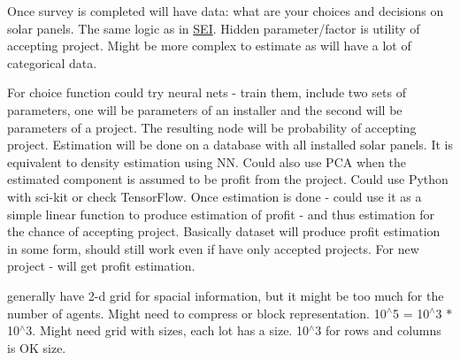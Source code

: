
\begin{DoxyRefList}
\item[\label{wp__wp000001}%
\hypertarget{wp__wp000001}{}%
Class \hyperlink{classsolar__core_1_1_household}{solar\+\_\+core\+:\+:Household} ]Once survey is completed will have data\+: what are your choices and decisions on solar panels. The same logic as in \hyperlink{classsolar__core_1_1_s_e_i}{S\+E\+I}. Hidden parameter/factor is utility of accepting project. Might be more complex to estimate as will have a lot of categorical data. 
\item[\label{wp__wp000002}%
\hypertarget{wp__wp000002}{}%
Class \hyperlink{classsolar__core_1_1_s_e_i}{solar\+\_\+core\+:\+:S\+E\+I} ]For choice function could try neural nets -\/ train them, include two sets of parameters, one will be parameters of an installer and the second will be parameters of a project. The resulting node will be probability of accepting project. Estimation will be done on a database with all installed solar panels. It is equivalent to density estimation using N\+N. Could also use P\+C\+A when the estimated component is assumed to be profit from the project. Could use Python with sci-\/kit or check Tensor\+Flow. Once estimation is done -\/ could use it as a simple linear function to produce estimation of profit -\/ and thus estimation for the chance of accepting project. Basically dataset will produce profit estimation in some form, should still work even if have only accepted projects. For new project -\/ will get profit estimation.  
\item[\label{wp__wp000003}%
\hypertarget{wp__wp000003}{}%
Class \hyperlink{classsolar__core_1_1_world_map}{solar\+\_\+core\+:\+:World\+Map} ]generally have 2-\/d grid for spacial information, but it might be too much for the number of agents. Might need to compress or block representation. 10$^\wedge$5 = 10$^\wedge$3 $\ast$ 10$^\wedge$3. Might need grid with sizes, each lot has a size. 10$^\wedge$3 for rows and columns is O\+K size.
\end{DoxyRefList}